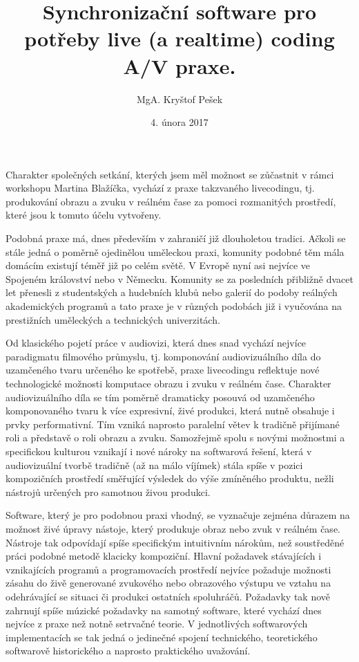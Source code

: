\documentclass[11pt]{article} %
\title{Synchronizační software pro potřeby live (a realtime) coding A/V praxe.}
\author{MgA. Kryštof Pešek}
\date{4. února 2017} %
\begin{document}
\maketitle


Charakter společných setkání, kterých jsem měl možnost se zůčastnit v rámci workshopu Martina Blažíčka, vychází z praxe takzvaného livecodingu, tj. produkování obrazu a zvuku v reálném čase za pomoci rozmanitých prostředí, které jsou k tomuto účelu vytvořeny.

Podobná praxe má, dnes především v zahraničí již dlouholetou tradici. Ačkoli se stále jedná o poměrně ojedinělou uměleckou praxi, komunity podobné těm mála domácím existují téměř již po celém světě. V Evropě nyní asi nejvíce ve Spojeném království nebo v Německu. Komunity se za posledních přibližně dvacet let přenesli z studentských a hudebních klubů nebo galerií do podoby reálných akademických programů a tato praxe je v různých podobách již i vyučována na prestižních uměleckých a technických univerzitách.

Od klasického pojetí práce v audiovizi, která dnes snad vychází nejvíce paradigmatu filmového průmyslu, tj. komponování audiovizuálního díla do uzamčeného tvaru určeného ke spotřebě, praxe livecodingu reflektuje nové technologické možnosti komputace obrazu i zvuku v reálném čase. Charakter audiovizuálního díla se tím poměrně dramaticky posouvá od uzamčeného komponovaného tvaru k více expresivní, živé produkci, která nutně obsahuje i prvky performativní. Tím vzniká naprosto paralelní větev k tradičně přijímané roli a představě o roli obrazu a zvuku. Samozřejmě spolu s novými možnostmi a specifickou kulturou vznikají i nové nároky na softwarová řešení, která v audiovizuální tvorbě tradičně (až na málo víjímek) stála spíše v pozici kompozičních prostředí směřující výsledek do výše zmíněného produktu, nežli nástrojů určených pro samotnou živou produkci.

Software, který je pro podobnou praxi vhodný, se vyznačuje zejména důrazem na možnost živé úpravy nástoje, který produkuje obraz nebo zvuk v reálném čase. Nástroje tak odpovídají spíše specifickým intuitivním nárokům, než soustředěné práci podobné metodě klacicky kompoziční. Hlavní požadavek stávajících i vznikajících programů a programovacích prostředí nejvíce požaduje možnosti zásahu do živě generované zvukového nebo obrazového výstupu ve vztahu na odehrávající se situaci či produkci ostatních spoluhráčů. Požadavky tak nově zahrnují spíše múzické požadavky na samotný software, které vychází dnes nejvíce z praxe než notně setrvačné teorie. V jednotlivých softwarových implementacích se tak jedná o jedinečné spojení technického, teoretického softwarově historického a naprosto praktického uvažování.
\end{document}
